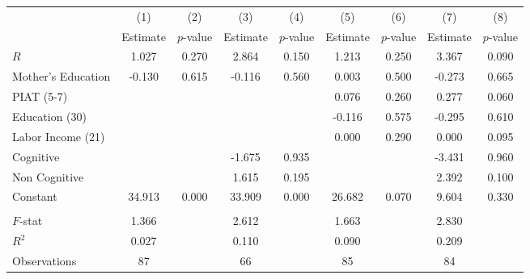 \begin{tabular}{lcccccccc} \toprule
 & (1) & (2) & (3) & (4) & (5) & (6) & (7) & (8) \\ 
 & Estimate  & $p$-value  & Estimate  & $p$-value  & Estimate  & $p$-value  & Estimate  & $p$-value  \\  \midrule
$R$ &     1.027 &     0.270 &     2.864 &     0.150 &     1.213 &     0.250 &     3.367 &     0.090 \\  
Mother's Education &    -0.130 &     0.615 &    -0.116 &     0.560 &     0.003 &     0.500 &    -0.273 &     0.665 \\  
PIAT (5-7) &         &         &         &         &     0.076 &     0.260 &     0.277 &     0.060 \\  
Education (30) &         &         &         &         &    -0.116 &     0.575 &    -0.295 &     0.610 \\  
Labor Income (21) &         &         &         &         &     0.000 &     0.290 &     0.000 &     0.095 \\  
Cognitive &         &         &    -1.675 &     0.935 &         &         &    -3.431 &     0.960 \\  
Non Cognitive &         &         &     1.615 &     0.195 &         &         &     2.392 &     0.100 \\  
Constant &    34.913 &     0.000 &    33.909 &     0.000 &    26.682 &     0.070 &     9.604 &     0.330 \\  \\ \midrule
$F$-stat &     1.366 &         &     2.612 &         &     1.663 &         &     2.830 &         \\  
$R^2$ &     0.027 &         &     0.110 &         &     0.090 &         &     0.209 &         \\  
Observations &    87 &         &    66 &         &    85 &         &    84 &         \\  
\bottomrule \end{tabular}
